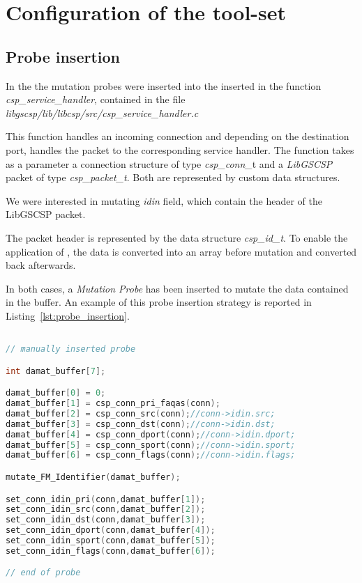 
\chapter{Configuration of the tool-set}

\section{Probe insertion}

In the \case the mutation probes were inserted into the inserted in the function \emph{csp\_service\_handler}, contained in the file \emph{libgscsp/lib/libcsp/src/csp\_service\_handler.c}

This function handles an incoming connection and depending on the destination port, handles the packet to the corresponding service handler. The function takes as a parameter a connection structure of type \emph{csp\_conn\_}t and a \emph{LibGSCSP} packet of type \emph{csp\_packet\_t}. Both are represented by custom data structures.

We were interested in mutating \emph{idin} field, which contain the header of the LibGSCSP packet.

The packet header is represented by the data structure \emph{csp\_id\_t}. To enable the application of \DAMA, the data is converted into an array before mutation and converted back afterwards.

In both cases, a \emph{Mutation Probe} has been inserted to mutate the data contained in the buffer.
An example of this probe insertion strategy is reported in Listing~\ref{lst:probe_insertion}.

\begin{lstlisting}[language=C++, caption=Probe insertion Strategy, label={lst:probe_insertion}]

// manually inserted probe

int damat_buffer[7];

damat_buffer[0] = 0;
damat_buffer[1] = csp_conn_pri_faqas(conn);
damat_buffer[2] = csp_conn_src(conn);//conn->idin.src;
damat_buffer[3] = csp_conn_dst(conn);//conn->idin.dst;
damat_buffer[4] = csp_conn_dport(conn);//conn->idin.dport;
damat_buffer[5] = csp_conn_sport(conn);//conn->idin.sport;
damat_buffer[6] = csp_conn_flags(conn);//conn->idin.flags;

mutate_FM_Identifier(damat_buffer);

set_conn_idin_pri(conn,damat_buffer[1]);
set_conn_idin_src(conn,damat_buffer[2]);
set_conn_idin_dst(conn,damat_buffer[3]);
set_conn_idin_dport(conn,damat_buffer[4]);
set_conn_idin_sport(conn,damat_buffer[5]);
set_conn_idin_flags(conn,damat_buffer[6]);

// end of probe

\end{lstlisting}


